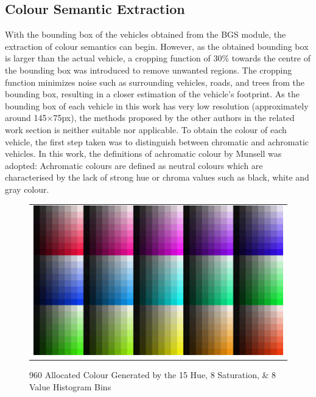 \subsection{Colour Semantic Extraction }
\label{section:versionOneColorExtract}

With the bounding box of the vehicles obtained from the BGS module, the extraction of colour semantics can begin.
However, as the obtained bounding box is larger than the actual vehicle, a cropping function of 30\% towards the centre of the bounding box was introduced to remove unwanted regions.
The cropping function minimizes noise such as surrounding vehicles, roads, and trees from the bounding box, resulting in a closer estimation of the vehicle's footprint.
As the bounding box of each vehicle in this work has very low resolution (approximately around 145$\times$75px), the methods proposed by the other authors in the related work section is neither suitable nor applicable.
To obtain the colour of each vehicle, the first step taken was to distinguish between chromatic and achromatic vehicles.
In this work, the definitions of achromatic colour by Munsell was adopted: Achromatic colours are defined as neutral colours which are characterised by the lack of strong hue or chroma values such as black, white and gray colour.

\begin{figure}[htb!]
  \centering
\begin{tabular}{c}
 \includegraphics[width=0.7\linewidth]{image/retrievalOne/all.png} \\
\end{tabular}
    \caption{960 Allocated Colour Generated by the 15 Hue, 8 Saturation, \& 8 Value Histogram Bins} \label{fig:hsvAllocated}
\end{figure}

